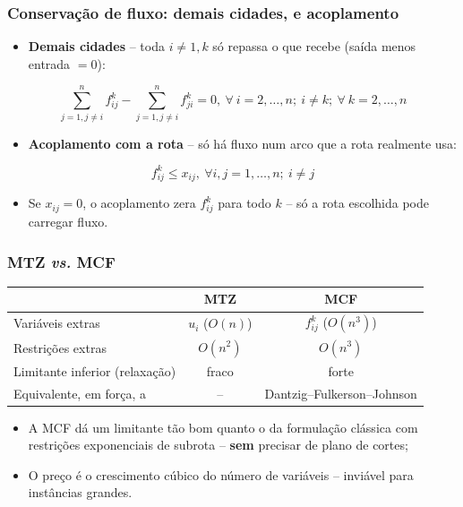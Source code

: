 \documentclass[fleqn]{beamer}
\begin{document}
\begin{frame}
	\frametitle{Conservação de fluxo: demais cidades, e acoplamento}
	\begin{itemize}
		\item \textbf{Demais cidades} -- toda $i \neq 1,k$ só repassa o
			que recebe (saída menos entrada $=0$):
	\end{itemize}
	$$
		\sum_{j=1,j\neq i}^{n} f_{ij}^{k} - \sum_{j=1,j\neq i}^{n} f_{ji}^{k} = 0,
		~\forall~i = 2,\ldots,n;~i \neq k;~\forall~k = 2,\ldots,n
	$$
	\begin{itemize}
		\item \textbf{Acoplamento com a rota} -- só há fluxo num arco que
			a rota realmente usa:
	\end{itemize}
	$$
		f_{ij}^{k} \leq x_{ij},~\forall i,j = 1,\ldots,n;~i\neq j
	$$
	\begin{itemize}
		\item Se $x_{ij}=0$, o acoplamento zera $f_{ij}^{k}$ para todo
			$k$ -- só a rota escolhida pode carregar fluxo.
	\end{itemize}
\end{frame}

\begin{frame}
	\frametitle{MTZ \emph{vs.} MCF}
	\begin{center}
	\footnotesize
	\begin{tabular}{lcc}
		\toprule
		 & MTZ & MCF \\
		\midrule
		Variáveis extras & $u_i$ ($O(n)$) & $f_{ij}^{k}$ ($O(n^3)$) \\
		Restrições extras & $O(n^2)$ & $O(n^3)$ \\
		Limitante inferior (relaxação) & fraco & forte \\
		Equivalente, em força, a & -- & Dantzig--Fulkerson--Johnson \\
		\bottomrule
	\end{tabular}
	\end{center}
	\begin{itemize}
		\item A MCF dá um limitante tão bom quanto o da formulação
			clássica com restrições exponenciais de subrota -- \textbf{sem}
			precisar de plano de cortes;
		\item O preço é o crescimento cúbico do número de variáveis --
			inviável para instâncias grandes.
	\end{itemize}
\end{frame}

\end{document}
